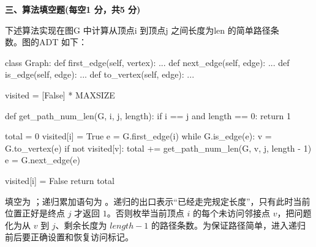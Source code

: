 \begin{question}
\begin{solution}
\begin{center}
\end{center}
\end{solution}
\end{question}

\textbf{三、算法填空题(每空1 分，共5 分)}
\begin{question}
下述算法实现在图G 中计算从顶点i 到顶点j 之间长度为len 的简单路径条\\
数。图的ADT 如下：
\begin{pycode}
class Graph:
    def first_edge(self, vertex): ...
    def next_edge(self, edge): ...
    def is_edge(self, edge): ...
    def to_vertex(self, edge): ...


visited = [False] * MAXSIZE


def get_path_num_len(G, i, j, length):
    if i == j and length == 0:
        return 1

    total = 0
    visited[i] = True
    e = G.first_edge(i)
    while G.is_edge(e):
        v = G.to_vertex(e)
        if not visited[v]:
            total += get_path_num_len(G, v, j, length - 1)
        e = G.next_edge(e)

    visited[i] = False
    return total
\end{pycode}

\begin{solution}
填空为 \texttt{}；递归累加语句为 \texttt{}。递归的出口表示“已经走完规定长度”，只有此时当前位置正好是终点 $j$ 才返回 $1$。否则枚举当前顶点 $i$ 的每个未访问邻接点 $v$，把问题化为从 $v$ 到 $j$、剩余长度为 $length-1$ 的路径条数。为保证路径简单，进入递归前后要正确设置和恢复访问标记。
\end{solution}
\end{question}

